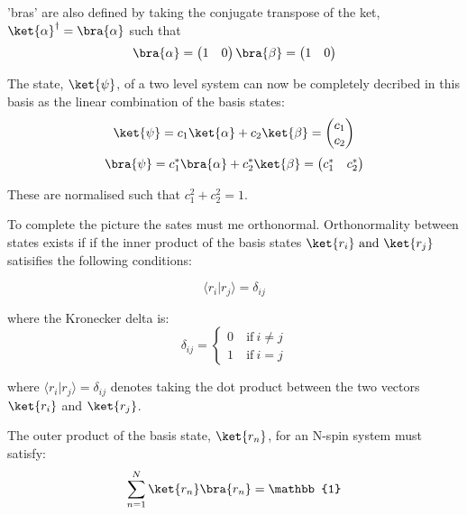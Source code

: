 'bras' are also defined by taking the conjugate transpose of the ket, $\ket{\alpha}^{\dagger} =
\bra{\alpha}$ such that
\begin{equation}
  \bra{\alpha} = \begin{pmatrix}
    1 & 0
\end{pmatrix}
  \bra{\beta} = \begin{pmatrix}
  1 & 0
\end{pmatrix}
\end{equation}

The state, $\ket{\psi}$, of a two level system can now be completely decribed in this basis
as the linear combination of the basis states:
\begin{equation}\label{eqn:zeeman}
  \ket{\psi} = c_1\ket{\alpha} + c_2\ket{\beta} = \begin{pmatrix}
    c_1\\
    c_2
\end{pmatrix}
\end{equation}
\begin{equation}
  \bra{\psi} = c_1^*\bra{\alpha} + c_2^*\ket{\beta} = \begin{pmatrix}
    c_1^* & c_2^*
\end{pmatrix}
\end{equation}

These are normalised such that $c_1^2 + c_2^2 = 1$.

To complete the picture the sates must me orthonormal. Orthonormality between states exists if
if the inner product of the basis states $\ket{r_i} ~\text{and}~ \ket{r_j}$ satisifies the following conditions:

\begin{equation}
  \langle r_i\vert r_j\rangle = \delta_{ij}
\end{equation}

where the Kronecker delta is:
\begin{equation}
  \delta_{ij} = \begin{cases}
    0 & ~\text{if}~ i \ne j\\
    1 & ~\text{if}~ i = j
                \end{cases}
\end{equation}

where $\langle r_i\vert r_j\rangle = \delta_{ij}$ denotes taking the dot product between the two
vectors $\ket{r_i}$ and $\ket{r_j}$.

The outer product of the basis state, $\ket{r_n}$, for an N-spin system must satisfy:
\begin{equation}
  \sum_{n=1}^{N} \ket{r_n}\bra{r_n} = \mathbb{1}
\end{equation}

